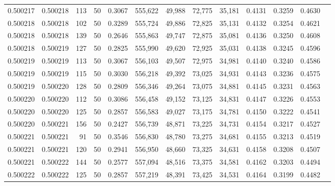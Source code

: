 \begin{tabular}{rrrrrrrrrrrrr}
0.500217 & 0.500218 &   113 &  50 &                                     0.3067 & 555,622 &  49,988 &  72,775 &  35,181 & 0.4131 & 0.3259 & 0.4630 \\
0.500218 & 0.500218 &   102 &  50 &                                     0.3289 & 555,724 &  49,886 &  72,825 &  35,131 & 0.4132 & 0.3254 & 0.4621 \\
0.500218 & 0.500218 &   139 &  50 &                                     0.2646 & 555,863 &  49,747 &  72,875 &  35,081 & 0.4136 & 0.3250 & 0.4608 \\
0.500218 & 0.500219 &   127 &  50 &                                     0.2825 & 555,990 &  49,620 &  72,925 &  35,031 & 0.4138 & 0.3245 & 0.4596 \\
0.500219 & 0.500219 &   113 &  50 &                                     0.3067 & 556,103 &  49,507 &  72,975 &  34,981 & 0.4140 & 0.3240 & 0.4586 \\
0.500219 & 0.500219 &   115 &  50 &                                     0.3030 & 556,218 &  49,392 &  73,025 &  34,931 & 0.4143 & 0.3236 & 0.4575 \\
0.500219 & 0.500220 &   128 &  50 &                                     0.2809 & 556,346 &  49,264 &  73,075 &  34,881 & 0.4145 & 0.3231 & 0.4563 \\
0.500220 & 0.500220 &   112 &  50 &                                     0.3086 & 556,458 &  49,152 &  73,125 &  34,831 & 0.4147 & 0.3226 & 0.4553 \\
0.500220 & 0.500220 &   125 &  50 &                                     0.2857 & 556,583 &  49,027 &  73,175 &  34,781 & 0.4150 & 0.3222 & 0.4541 \\
0.500220 & 0.500221 &   156 &  50 &                                     0.2427 & 556,739 &  48,871 &  73,225 &  34,731 & 0.4154 & 0.3217 & 0.4527 \\
0.500221 & 0.500221 &    91 &  50 &                                     0.3546 & 556,830 &  48,780 &  73,275 &  34,681 & 0.4155 & 0.3213 & 0.4519 \\
0.500221 & 0.500221 &   120 &  50 &                                     0.2941 & 556,950 &  48,660 &  73,325 &  34,631 & 0.4158 & 0.3208 & 0.4507 \\
0.500221 & 0.500222 &   144 &  50 &                                     0.2577 & 557,094 &  48,516 &  73,375 &  34,581 & 0.4162 & 0.3203 & 0.4494 \\
0.500222 & 0.500222 &   125 &  50 &                                     0.2857 & 557,219 &  48,391 &  73,425 &  34,531 & 0.4164 & 0.3199 & 0.4482 \\

\end{tabular}
